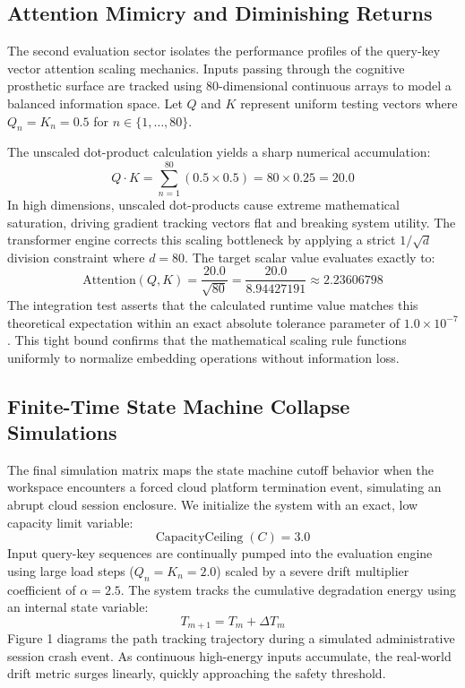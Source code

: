 \subsection{Attention Mimicry and Diminishing Returns}

The second evaluation sector isolates the performance profiles of the query-key vector attention scaling mechanics. Inputs passing through the cognitive prosthetic surface are tracked using 80-dimensional continuous arrays to model a balanced information space. Let $Q$ and $K$ represent uniform testing vectors where $Q_n = K_n = 0.5$ for $n \in \{1, \dots, 80\}$. 

The unscaled dot-product calculation yields a sharp numerical accumulation:
\[
Q \cdot K = \sum_{n=1}^{80} (0.5 \times 0.5) = 80 \times 0.25 = 20.0
\]
In high dimensions, unscaled dot-products cause extreme mathematical saturation, driving gradient tracking vectors flat and breaking system utility. The transformer engine corrects this scaling bottleneck by applying a strict $1/\sqrt{d}$ division constraint where $d=80$. The target scalar value evaluates exactly to:
\[
\text{Attention}(Q, K) = \frac{20.0}{\sqrt{80}} = \frac{20.0}{8.94427191} \approx 2.23606798
\]
The integration test asserts that the calculated runtime value matches this theoretical expectation within an exact absolute tolerance parameter of $1.0 \times 10^{-7}$. This tight bound confirms that the mathematical scaling rule functions uniformly to normalize embedding operations without information loss.

\subsection{Finite-Time State Machine Collapse Simulations}

The final simulation matrix maps the state machine cutoff behavior when the workspace encounters a forced cloud platform termination event, simulating an abrupt cloud session enclosure. We initialize the system with an exact, low capacity limit variable:
\[
\text{CapacityCeiling} \; (C) = 3.0
\]
Input query-key sequences are continually pumped into the evaluation engine using large load steps ($Q_n = K_n = 2.0$) scaled by a severe drift multiplier coefficient of $\alpha = 2.5$. The system tracks the cumulative degradation energy using an internal state variable:
\[
T_{m+1} = T_m + \Delta T_m
\]
Figure 1 diagrams the path tracking trajectory during a simulated administrative session crash event. As continuous high-energy inputs accumulate, the real-world drift metric surges linearly, quickly approaching the safety threshold.

